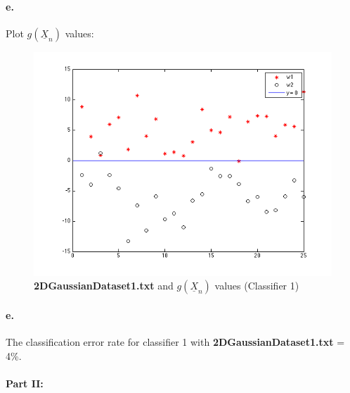 \documentclass[a4paper]{article}
\begin{document}
\paragraph{e.} Plot $g(\underline{X}_{n})$ values: \\
\begin{figure}[H]
  \centering
    \includegraphics[scale=.6]{images/1_e.png}
  \caption{\textbf{2DGaussianDataset1.txt} and $g(\underline{X}_{n})$ values (Classifier 1)}
\end{figure}

\paragraph{e.} The classification error rate for classifier 1 with \textbf{2DGaussianDataset1.txt} = 4\%.

\paragraph{Part II:}
\end{document}
